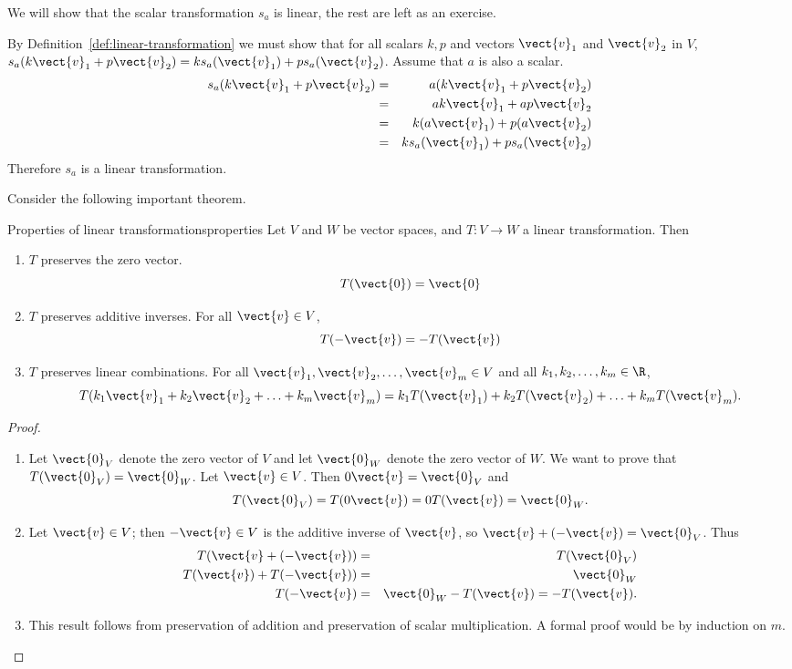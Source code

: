 \begin{solution}
We will show that the scalar transformation $s_a$ is linear, the rest are left as an exercise. 

By Definition~\ref{def:linear-transformation} we must show that for all scalars $k ,p $ and 
vectors $\vect{v}_1$ and $\vect{v}_2$ in $V$, $s_a(k \vect{v}_1 + p \vect{v}_2) = k s_a(\vect{v}_1)+ p s_a(\vect{v}_{2})$. Assume that $a$ is also a scalar. 
\begin{eqnarray*}
s_a(k \vect{v}_1 + p \vect{v}_2) &=& a (k \vect{v}_1 + p \vect{v}_2) \\
&=&  ak \vect{v}_1 + ap \vect{v}_2  \\
 &=&  k (a \vect{v}_1) + p(a \vect{v}_2)  \\
&=& k s_a(\vect{v}_1)  + p s_a (\vect{v}_2)
\end{eqnarray*}
Therefore $s_a$ is a linear transformation.
\end{solution}

Consider the following important theorem.

\begin{theorem}{Properties of linear transformations}{properties}
Let $V$ and $W$ be vector spaces, and $T:V \to W$ a linear
transformation. 
Then
\begin{enumerate}
\item $T$ preserves the zero vector.
\[
T(\vect{0})=\vect{0}
\]
\item $T$ preserves additive inverses. 
For all $\vect{v}\in V$, 
\[
T(-\vect{v})= -T(\vect{v})
\]
\item $T$ preserves linear combinations.
For all $\vect{v}_1, \vect{v}_2, \ldots, \vect{v}_m \in V$ and
all $k_1, k_2, \ldots, k_m\in\R$,
\[ T(k_1\vect{v}_1 + k_2\vect{v}_2 + \ldots + k_m\vect{v}_m)
= k_1T(\vect{v}_1) + k_2T(\vect{v}_2) + \ldots + k_mT(\vect{v}_m).\]
\end{enumerate}
\end{theorem}

\begin{proof}
\begin{enumerate}
\item Let $\vect{0}_V$ denote the zero vector of $V$ and let
$\vect{0}_W$ denote the zero vector of $W$.
We want to prove that $T(\vect{0}_V)=\vect{0}_W$.
Let $\vect{v}\in V$. 
Then $0\vect{v}=\vect{0}_V$ and
\[ T(\vect{0}_V)=T(0\vect{v})=0T(\vect{v})=\vect{0}_W.\]
\item
Let $\vect{v}\in V$; then $-\vect{v}\in V$ is the additive
inverse of $\vect{v}$, so $\vect{v} + (-\vect{v})=\vect{0}_V$.
Thus
\begin{eqnarray*}
T(\vect{v} + (-\vect{v})) & = & T(\vect{0}_V) \\
T(\vect{v}) + T(-\vect{v})) & = & \vect{0}_W \\
T(-\vect{v}) & = & \vect{0}_W - T(\vect{v}) =  - T(\vect{v}).
\end{eqnarray*}
\item This result follows from 
preservation of addition and preservation of scalar multiplication.
A formal proof would be by induction on $m$.
\end{enumerate}
\end{proof}

